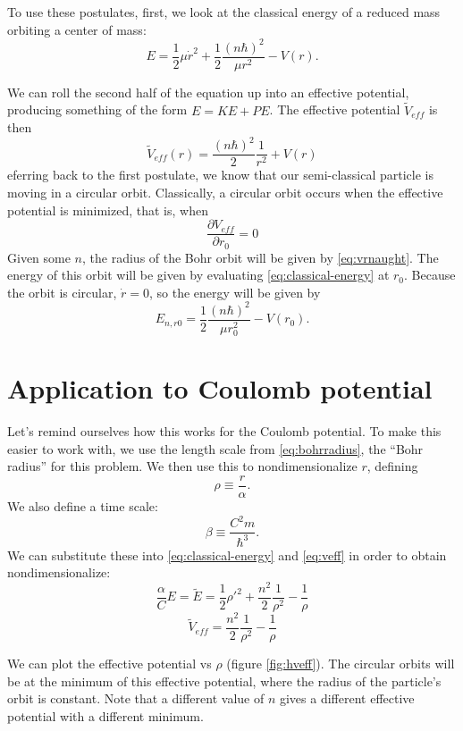 \documentclass[12pt,twoside]{reedthesis}
\newcommand{\eqn}[1]{\begin{equation}#1\end{equation}}
\begin{document}
To use these postulates, first, we look at the classical energy of a reduced mass orbiting a center of mass:
\eqn{
E = \frac{1}{2}\mu \dot{r}^2+\frac{1}{2}\frac{(n \hbar)^2}{\mu r^2}-V(r)\mbox{.}
\label{eq:classical-energy}
}

We can roll the second half of the equation up into an effective potential, producing something of the form $E = KE + PE$. The effective potential $\tilde{V}_{eff}$ is then
\eqn{
\tilde{V}_{eff}(r)=\frac{(n \hbar)^2}{2}\frac{1}{r^2}+V(r)
\label{eq:veff}
}
eferring back to the first postulate, we know that our semi-classical particle is moving in a circular orbit. Classically, a circular orbit occurs when the effective potential is minimized, that is, when
\eqn{
\frac{\partial V_{eff}}{\partial r_0} = 0
\label{eq:vrnaught}
}
Given some $n$, the radius of the Bohr orbit will be given by \eqref{eq:vrnaught}. The energy of this orbit will be given by evaluating \eqref{eq:classical-energy}
 at $r_0$. Because the orbit is circular, $\dot{r} = 0$, so the energy will be given by
\eqn{
E_{n,r0} = \frac{1}{2}\frac{(n\hbar)^2}{\mu r_0^2} - V(r_0)\mbox{.}
}

\section{Application to Coulomb potential}
Let's remind ourselves how this works for the Coulomb potential. To make this easier to work with, we use the length scale from \eqref{eq:bohrradius}, the ``Bohr radius'' for this problem. We then use this to nondimensionalize $r$, defining
\begin{equation}
\rho \equiv \frac{r}{\alpha}\mbox{.}
\label{eq:rho}
\end{equation}
We also define a time scale:
\begin{equation}
\beta \equiv \frac{C^2m}{\hbar^3}\mbox{.}
\label{eq:beta}
\end{equation}
We can substitute these into \eqref{eq:classical-energy} and \eqref{eq:veff} in order to obtain nondimensionalize:
\eqn{
\frac{\alpha}{C}E = \tilde{E}= \frac{1}{2}\rho '^2 + \frac{n^2}{2}\frac{1}{\rho^2}-\frac{1}{\rho}
\label{eq:energy-nondim}
}
\eqn{
\tilde{V}_{eff} = \frac{n^2}{2}\frac{1}{\rho^2}-\frac{1}{\rho}
\label{eq:veff-nondim}
}

We can plot the effective potential vs $\rho$ (figure \ref{fig:hveff}). The circular orbits will be at the minimum of this effective potential, where the radius of the particle's orbit is constant. Note that a different value of $n$ gives a different effective potential with a different minimum. 
\end{document}
